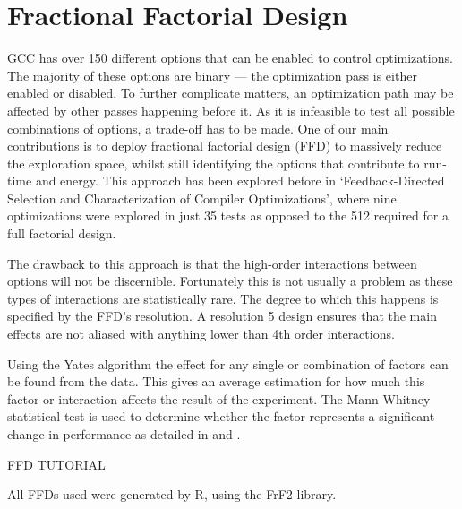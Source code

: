 \documentclass[twocolumn]{article}
\begin{document}
\section{Fractional Factorial Design}

GCC has over 150 different options that can be enabled to control optimizations. The majority of these options are binary --- the optimization pass is either enabled or disabled. To further complicate matters, an optimization path may be affected by other passes happening before it. As it is infeasible to test all possible combinations of options, a trade-off has to be made. One of our main contributions is to deploy fractional factorial design (FFD) to massively reduce the exploration space, whilst still identifying the options that contribute to run-time and energy. This approach has been explored before in `Feedback-Directed Selection and Characterization of Compiler Optimizations'\cite{IntelPaper}, where nine optimizations were explored in just 35 tests as opposed to the 512 required for a full factorial design.

The drawback to this approach is that the high-order interactions between options will not be discernible. Fortunately this is not usually a problem as these types of interactions are statistically rare. The degree to which this happens is specified by the FFD's resolution. A resolution 5 design ensures that the main effects are not aliased with anything lower than 4th order interactions.

Using the Yates algorithm\cite{BoxHunter} the effect for any single or combination of factors can be found from the data. This gives an average estimation for how much this factor or interaction affects the result of the experiment. The Mann-Whitney statistical test is used to determine whether the factor represents a significant change in performance as detailed in \cite{EnergyReductionCompilerOptions} and \cite{Haneda2005}.

FFD TUTORIAL

All FFDs used were generated by R\cite{R}, using the FrF2 library\cite{FrF2}.
\end{document}
